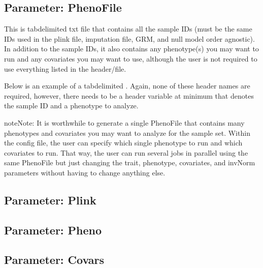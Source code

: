 \documentclass[letterpaper,10pt,english]{sphinxmanual}
\let\sphinxpxdimen\pdfpxdimen\else\newdimen\sphinxpxdimen
\begin{document}
\subsection{Parameter: PhenoFile}
\label{\detokenize{fileFormats:parameter-phenofile}}\label{\detokenize{fileFormats:phenotype-file-format}}
This is tab\sphinxhyphen{}delimited txt file that contains all the sample IDs (must be the same IDs used in the plink file, imputation file, GRM, and null model \sphinxhyphen{}\sphinxhyphen{} order agnostic).  In addition to the sample IDs, it also contains any phenotype(s) you may want to run and any covariates you may want to use, although the user is not required to use everything listed in the header/file.

Below is an example of a tab\sphinxhyphen{}delimited .  Again, none of these header names are required, however, there needs to be a header variable at minimum that denotes the sample ID and a phenotype to analyze.

\noindent\sphinxincludegraphics[width=800\sphinxpxdimen]{{phenoFile}.png}

\begin{sphinxadmonition}{note}{Note:}
It is worthwhile to generate a single PhenoFile that contains many phenotypes and covariates you may want to analyze for the sample set.  Within the config file, the user can specify which single phenotype to run and which covariates to run.  That way, the user can run several jobs in parallel using the same PhenoFile but just changing the trait, phenotype, covariates, and invNorm parameters without having to change anything else.
\end{sphinxadmonition}


\subsection{Parameter: Plink}
\label{\detokenize{fileFormats:parameter-plink}}\label{\detokenize{fileFormats:plink-file-format}}

\subsection{Parameter: Pheno}
\label{\detokenize{fileFormats:parameter-pheno}}

\subsection{Parameter: Covars}
\label{\detokenize{fileFormats:parameter-covars}}
\end{document}
